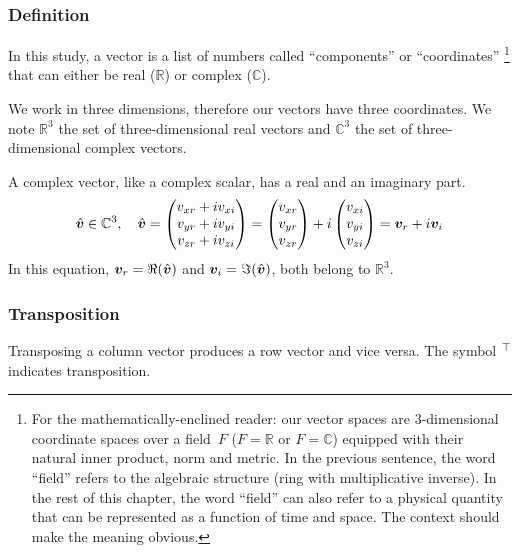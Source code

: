 \subsubsection{Definition}
In this study, a vector is a list of numbers called ``components'' or ``coordinates''%
\footnote{
    For the mathematically-enclined reader:
    our vector spaces are 3-dimensional coordinate spaces over a field~$F$ ($F=\mathbb{R}$ or $F=\mathbb{C}$) equipped with their natural inner product, norm and metric.
    In the previous sentence, the word ``field'' refers to the algebraic structure (ring with multiplicative inverse).
    In the rest of this chapter, the word ``field'' can also refer to a physical quantity that can be represented as a function of time and space.
    The context should make the meaning obvious.
}
that can either be real ($\mathbb{R}$) or complex ($\mathbb{C}$).

We work in three dimensions, therefore our vectors have three coordinates.
We note
$\mathbb{R}^3$ the set of three-dimensional real vectors and
$\mathbb{C}^3$ the set of three-dimensional complex vectors.

A complex vector, like a complex scalar, has a real and an imaginary part.
\begin{equation}
    \hat{\bm{v}} \in \mathbb{C}^3,
    \quad
    \hat{\bm{v}}
    =
    \begin{pmatrix}
        v_{xr} + i v_{xi}\\
        v_{yr} + i v_{yi}\\
        v_{zr} + i v_{zi}
    \end{pmatrix}
    =
    \begin{pmatrix}
        v_{xr}\\
        v_{yr}\\
        v_{zr}
    \end{pmatrix}
    +
    i
    \begin{pmatrix}
        v_{xi}\\
        v_{yi}\\
        v_{zi}
    \end{pmatrix}
    =
    \bm{v}_r + i \bm{v}_i
\end{equation}
In this equation, $\bm{v}_r = \Re(\hat{\bm{v}})$ and $\bm{v}_i = \Im(\hat{\bm{v}})$,
both belong to $\mathbb{R}^3$.


\subsubsection{Transposition}
Transposing a column vector produces a row vector and vice versa.
The symbol $^\top$ indicates transposition.

